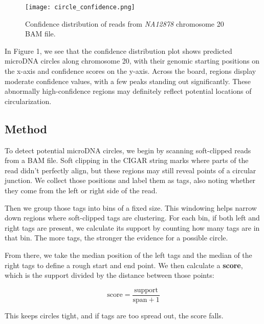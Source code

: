 \documentclass[11pt, letterpaper]{article}
\begin{document}
\begin{figure} [H]
    \centering
    \texttt{[image: circle\_confidence.png]}
    \caption{Confidence distribution of reads from \textit{NA12878} chromosome 20 BAM file.}
    \label{fig:circle-confidence}
\end{figure}

In Figure 1, we see that the confidence distribution plot shows predicted microDNA circles along chromosome 20, with their genomic starting positions on the x-axis and confidence scores on the y-axis. Across the board, regions display moderate confidence values, with a few peaks standing out significantly. These abnormally high-confidence regions may definitely reflect potential locations of circularization.


\subsection{Method}


To detect potential microDNA circles, we begin by scanning soft-clipped reads from a BAM file. Soft clipping in the CIGAR string marks where parts of the read didn’t perfectly align, but these regions may still reveal points of a circular junction. We collect those positions and label them as tags, also noting whether they come from the left or right side of the read.

\vspace{\baselineskip}

Then we group those tags into bins of a fixed size. This windowing helps narrow down regions where soft-clipped tags are clustering. For each bin, if both left and right tags are present, we calculate its support by counting how many tags are in that bin. The more tags, the stronger the evidence for a possible circle.

\vspace{\baselineskip}

From there, we take the median position of the left tags and the median of the right tags to define a rough start and end point. We then calculate a \textbf{score}, which is the support divided by the distance between those points:

\[
\text{score} = \frac{\text{support}}{\text{span} + 1}
\]

This keeps circles tight, and if tags are too spread out, the score falls.

\vspace{\baselineskip}
\end{document}
